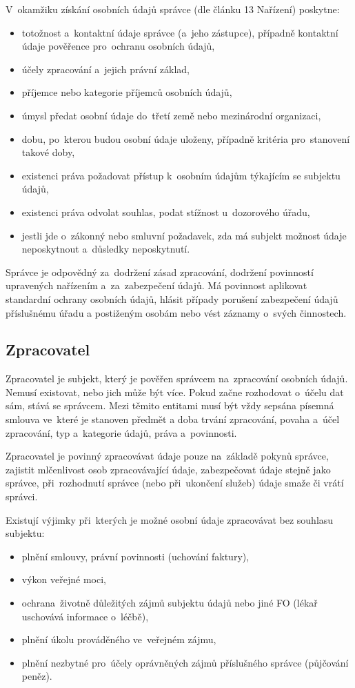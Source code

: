 V~okamžiku získání osobních údajů správce (dle článku 13 Nařízení) poskytne:

\begin{itemize}
    \item totožnost a~kontaktní údaje správce (a~jeho zástupce), případně kontaktní údaje pověřence pro~ochranu osobních údajů,
    \item účely zpracování a~jejich právní základ,
    \item příjemce nebo kategorie příjemců osobních údajů,
    \item úmysl předat osobní údaje do~třetí země nebo mezinárodní organizaci,
    \item dobu, po~kterou budou osobní údaje uloženy, případně kritéria pro~stanovení takové doby,
    \item existenci práva požadovat přístup k~osobním údajům týkajícím se subjektu údajů,
    \item existenci práva odvolat souhlas, podat stížnost u~dozorového úřadu,
    \item jestli jde o~zákonný nebo smluvní požadavek, zda má subjekt možnost údaje neposkytnout a~důsledky neposkytnutí.
\end{itemize}

Správce je odpovědný za~dodržení zásad zpracování, dodržení povinností upravených nařízením a~za~zabezpečení údajů.
Má povinnost aplikovat standardní ochrany osobních údajů, hlásit případy porušení zabezpečení údajů příslušnému úřadu a postiženým osobám nebo vést záznamy o~svých činnostech.


\subsection{Zpracovatel}

Zpracovatel je subjekt, který je pověřen správcem na~zpracování osobních údajů.
Nemusí existovat, nebo jich může být více.
Pokud začne rozhodovat o~účelu dat sám, stává se správcem.
Mezi těmito entitami musí být vždy sepsána písemná smlouva ve~které je stanoven předmět a doba trvání zpracování, povaha a~účel zpracování, typ a~kategorie údajů, práva a~povinnosti.

Zpracovatel je povinný zpracovávat údaje pouze na~základě pokynů správce, zajistit mlčenlivost osob zpracovávající údaje, zabezpečovat údaje stejně jako správce, při~rozhodnutí správce (nebo při~ukončení služeb) údaje smaže či vrátí správci.

Existují výjimky při~kterých je možné osobní údaje zpracovávat bez souhlasu subjektu:
\begin{itemize}
    \item plnění smlouvy, právní povinnosti (uchování faktury),
    \item výkon veřejné moci,
    \item ochrana~životně důležitých zájmů subjektu údajů nebo jiné FO (lékař uschovává informace o~léčbě),
    \item plnění úkolu prováděného ve~veřejném zájmu,
    \item plnění nezbytné pro~účely oprávněných zájmů příslušného správce (půjčování peněz).
\end{itemize}


